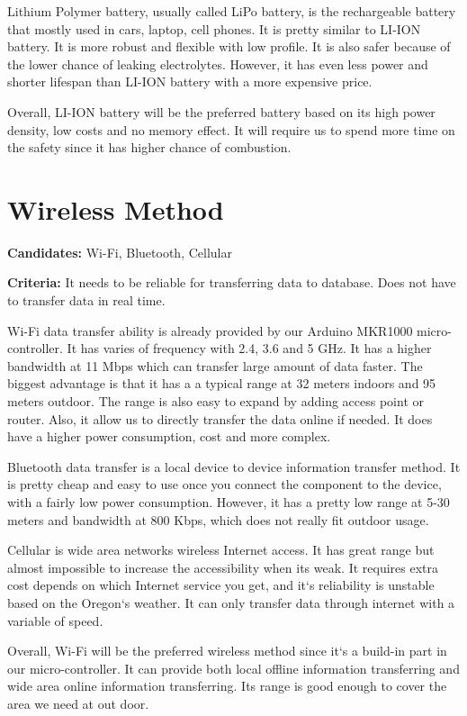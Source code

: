 \documentclass[IEEEtran,letterpaper,10pt,titlepage,fleqn,draftclsnofoot,onecolumn]{article}
\begin{document}
Lithium Polymer battery\cite{liion_vs_lipo}, usually called LiPo battery, is the rechargeable battery that mostly used in cars, laptop, cell phones. It is pretty similar to LI-ION battery. It is more robust and flexible with low profile. It is also safer because of the lower chance of leaking electrolytes. However, it has even less power and shorter lifespan than LI-ION battery with a more expensive price.

Overall, LI-ION battery will be the preferred battery based on its high power density, low costs and no memory effect. It will require us to spend more time on the safety since it has higher chance of combustion. 

\section{Wireless Method}

\textbf{Candidates:} Wi-Fi, Bluetooth, Cellular

\textbf{Criteria:} It needs to be reliable for transferring data to database. Does not have to transfer data in real time.

Wi-Fi data transfer ability is already provided by our Arduino MKR1000 micro-controller\cite{bluetooth_vs_wifi}. It has varies of frequency with 2.4, 3.6 and 5 GHz. It has a higher bandwidth at 11 Mbps which can transfer large amount of data faster. The biggest advantage is that it has a a typical range at 32 meters indoors and 95 meters outdoor. The range is also easy to expand by adding access point or router. Also, it allow us to directly transfer the data online if needed. It does have a higher power consumption, cost and more complex.     

Bluetooth data transfer is a local device to device information transfer method\cite{bluetooth_vs_wifi}. It is pretty cheap and easy to use once you connect the component to the device, with a fairly low power consumption. However, it has a pretty low range at 5-30 meters and bandwidth at 800 Kbps, which does not really fit outdoor usage. 

Cellular\cite{cecullar} is wide area networks wireless Internet access. It has great range but almost impossible to increase the accessibility when its weak. It requires extra cost depends on which Internet service you get, and it`s reliability is unstable based on the Oregon`s weather. It can only transfer data through internet with a variable of speed.

Overall, Wi-Fi will be the preferred wireless method since it`s a build-in part in our micro-controller. It can provide both local offline information transferring and wide area online information transferring. Its range is good enough to cover the area we need at out door.




\end{document}
